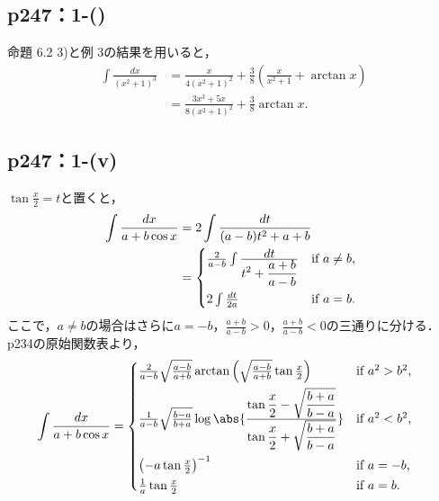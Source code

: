 \subsection*{p247：1-()}

\begin{tanswer}
    命題 6.2 3)と例 3の結果を用いると，
    \begin{align*}
        \int \frac{dx}{(x^2 + 1)^3}
         & = \frac{x}{4(x^2 + 1)^2} + \frac{3}{8}(\frac{x}{x^2 + 1} + \arctan x) \\
         & = \frac{3x^3 + 5x}{8(x^2+1)^2} + \frac{3}{8} \arctan x.
    \end{align*}
\end{tanswer}

\subsection*{p247：1-(v)}


\begin{tanswer}
    $\tan \frac{x}{2} = t$と置くと，
    \begin{align*}
        \int \frac{dx}{a+b \cos x}
         & = 2 \int \frac{dt}{(a-b)t^2 + a+b} \\
         & =
        \begin{cases*}
            \frac{2}{a-b} \int \frac{\displaystyle dt}{\displaystyle t^2 + \frac{a+b}{a-b}}
                                 & if $a \neq b$, \\
            2 \int \frac{dt}{2a} & if $a = b$.
        \end{cases*}
    \end{align*}
    ここで，$a \neq b$の場合はさらに$a = -b$，$\frac{a+b}{a-b} > 0$，$\frac{a+b}{a-b} < 0$の三通りに分ける．p234の原始関数表より，
    \begin{align*}
        \int \frac{dx}{a+b \cos x}
         & =
        \begin{cases*}
            \frac{2}{a-b} \sqrt{\frac{a-b}{a+b}}
            \arctan \left({\sqrt{\frac{a-b}{a+b}} \tan \frac{x}{2}}\right) & if $a^2 > b^2$, \\
            \frac{1}{a-b} \sqrt{\frac{b-a}{b+a}}
            \log \abs{\frac{\displaystyle\tan \frac{x}{2}
                    - \sqrt{\frac{b+a}{b-a}}}{\displaystyle\tan \frac{x}{2} + \sqrt{\frac{b+a}{b-a}}}}
                                                                           & if $a^2 < b^2$, \\
            \left(-a \tan \frac{x}{2}\right)^{-1}                          & if $a = -b$,    \\
            \frac{1}{a} \tan {\frac{x}{2}}                                 & if $a = b$.
        \end{cases*}
    \end{align*}
\end{tanswer}

